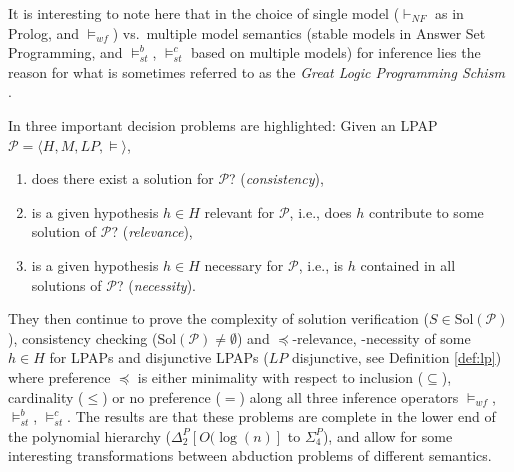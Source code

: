 \documentclass[a4paper]{article}
\newcommand{\problem}{\ensuremath{\mathscr{P}}}
\newcommand{\entails}{\models}
\newcommand{\sol}{\mathrm{Sol}}
\newcommand{\wf}{\ensuremath{\entails_{wf}}}
\newcommand{\brave}{\ensuremath{\entails_{st}^b}}
\newcommand{\caut}{\ensuremath{\entails_{st}^c}}
\newcommand{\sldnf}{\ensuremath{\vdash_{NF}}}
\begin{document}
It is interesting to note here that in the choice of single model ($\sldnf$ as in Prolog, and $\wf$) vs.~multiple model semantics (stable models in Answer Set Programming, and $\brave$, $\caut$ based on multiple models) for inference lies the reason for what is sometimes referred to as the \emph{Great Logic Programming Schism} \cite[Section 3, p.~13]{DBLP:conf/rweb/2009}.

In \cite{DBLP:journals/tcs/EiterGL97} three important decision problems are highlighted: Given an LPAP $\problem = \langle H, M, LP, \entails \rangle$,\begin{enumerate} \setlength\itemsep{-1mm} \item does there exist a solution for $\problem$? (\emph{consistency}),
\item is a given hypothesis $h \in H$ relevant for $\problem$, i.e., does $h$ contribute to some solution of $\problem$? (\emph{relevance}),
\item is a given hypothesis $h \in H$ necessary for $\problem$, i.e., is $h$ contained in all solutions of $\problem$? (\emph{necessity}).
\end{enumerate}

They then continue to prove the complexity of solution verification ($S \in \sol(\problem)$), consistency checking ($\sol(\problem) \not = \emptyset$) and $\preceq$-relevance, -necessity of some $h \in H$ for LPAPs and disjunctive LPAPs ($LP$ disjunctive, see Definition \ref{def:lp}) where preference $\preceq$ is either minimality with respect to inclusion ($\subseteq$), cardinality ($\leq$) or no preference ($=$) along all three inference operators $\wf$, $\brave$, $\caut$. The results are that these problems are complete in the lower end of the polynomial hierarchy ($\Delta_2^P[O(\log(n)]$ to $\Sigma_4^P$), and allow for some interesting transformations between abduction problems of different semantics.


\end{document}
